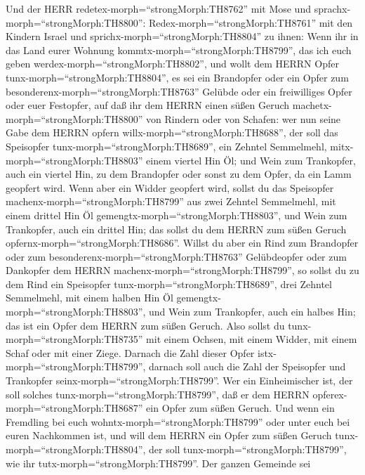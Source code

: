  Und der HERR redetex-morph=``strongMorph:TH8762'' mit Mose
und sprachx-morph=``strongMorph:TH8800'': 
Redex-morph=``strongMorph:TH8761'' mit den Kindern Israel und
sprichx-morph=``strongMorph:TH8804'' zu ihnen: Wenn ihr in das Land
eurer Wohnung kommtx-morph=``strongMorph:TH8799'', das ich euch geben
werdex-morph=``strongMorph:TH8802'',  und wollt dem HERRN
Opfer tunx-morph=``strongMorph:TH8804'', es sei ein Brandopfer oder ein
Opfer zum besonderenx-morph=``strongMorph:TH8763'' Gelübde oder ein
freiwilliges Opfer oder euer Festopfer, auf daß ihr dem HERRN einen
süßen Geruch machetx-morph=``strongMorph:TH8800'' von Rindern oder von
Schafen:  wer nun seine Gabe dem HERRN opfern
willx-morph=``strongMorph:TH8688'', der soll das Speisopfer
tunx-morph=``strongMorph:TH8689'', ein Zehntel Semmelmehl,
mitx-morph=``strongMorph:TH8803'' einem viertel Hin Öl;  und
Wein zum Trankopfer, auch ein viertel Hin, zu dem Brandopfer oder sonst
zu dem Opfer, da ein Lamm geopfert wird.  Wenn aber ein
Widder geopfert wird, sollst du das Speisopfer
machenx-morph=``strongMorph:TH8799'' aus zwei Zehntel Semmelmehl, mit
einem drittel Hin Öl gemengtx-morph=``strongMorph:TH8803'', 
und Wein zum Trankopfer, auch ein drittel Hin; das sollst du dem HERRN
zum süßen Geruch opfernx-morph=``strongMorph:TH8686''. 
Willst du aber ein Rind zum Brandopfer oder zum
besonderenx-morph=``strongMorph:TH8763'' Gelübdeopfer oder zum Dankopfer
dem HERRN machenx-morph=``strongMorph:TH8799'',  so sollst
du zu dem Rind ein Speisopfer tunx-morph=``strongMorph:TH8689'', drei
Zehntel Semmelmehl, mit einem halben Hin Öl
gemengtx-morph=``strongMorph:TH8803'',  und Wein zum
Trankopfer, auch ein halbes Hin; das ist ein Opfer dem HERRN zum süßen
Geruch.  Also sollst du tunx-morph=``strongMorph:TH8735''
mit einem Ochsen, mit einem Widder, mit einem Schaf oder mit einer
Ziege.  Darnach die Zahl dieser Opfer
istx-morph=``strongMorph:TH8799'', darnach soll auch die Zahl der
Speisopfer und Trankopfer seinx-morph=``strongMorph:TH8799''.
 Wer ein Einheimischer ist, der soll solches
tunx-morph=``strongMorph:TH8799'', daß er dem HERRN
opferex-morph=``strongMorph:TH8687'' ein Opfer zum süßen Geruch.
 Und wenn ein Fremdling bei euch
wohntx-morph=``strongMorph:TH8799'' oder unter euch bei euren Nachkommen
ist, und will dem HERRN ein Opfer zum süßen Geruch
tunx-morph=``strongMorph:TH8804'', der soll
tunx-morph=``strongMorph:TH8799'', wie ihr
tutx-morph=``strongMorph:TH8799''.  Der ganzen Gemeinde sei
